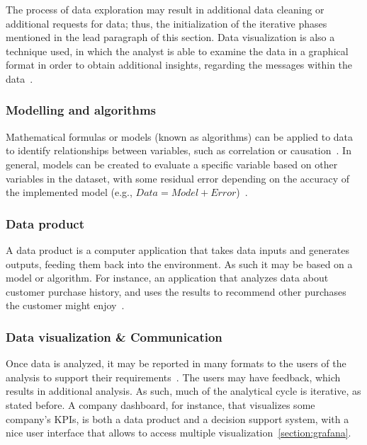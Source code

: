 The process of data exploration may result in additional data cleaning or additional requests for data; thus, the initialization of the iterative phases mentioned in the lead paragraph of this section.
Data visualization is also a technique used, in which the analyst is able to examine the data in a graphical format in order to obtain additional insights, regarding the messages within the data~\cite{Book:doing_data_science}.

\subsubsection{Modelling and algorithms}
Mathematical formulas or models (known as algorithms) can be applied to data to identify relationships between variables, such as correlation or causation~\cite{Book:pruneau_2017}.
In general, models can be created to evaluate a specific variable based on other variables in the dataset, with some residual error depending on the accuracy of the implemented model (e.g., $Data = Model + Error$)~\cite{Book:judd_1989_data_model}.

\subsubsection{Data product}
A data product is a computer application that takes data inputs and generates outputs, feeding them back into the environment.
As such it may be based on a model or algorithm. For instance, an application that analyzes data about customer purchase history, and uses the results to recommend other purchases the customer might enjoy~\cite{Book:doing_data_science}.

\subsubsection{Data visualization \& Communication}
Once data is analyzed, it may be reported in many formats to the users of the analysis to support their requirements~\cite{Article:intro_to_data_analysis}. 
The users may have feedback, which results in additional analysis. As such, much of the analytical cycle is iterative, as stated before.
A company dashboard, for instance, that visualizes some company's \ac{KPIs}, is both a data product and a decision support system, with a nice user interface that allows  to access multiple visualization~\ref{section:grafana}.

